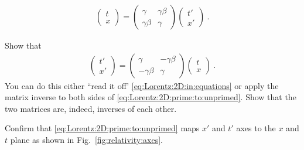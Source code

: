 \documentclass[12pt, oneside]{report}    %
\begin{document}
\begin{align}
    \begin{pmatrix}
        t\\
        x
    \end{pmatrix}
    =
    \begin{pmatrix}
        \gamma & \gamma \beta \\
        \gamma \beta & \gamma
    \end{pmatrix}
    \begin{pmatrix}
        t'\\
        x'
    \end{pmatrix} \ .
    \label{eq:Lorentz:2D:prime:to:unprimed}
\end{align}
\begin{exercise}
Show that 
\begin{align}
    \begin{pmatrix}
        t'\\
        x'
    \end{pmatrix}
    =
    \begin{pmatrix}
        \gamma & -\gamma \beta \\
        -\gamma \beta & \gamma
    \end{pmatrix}
    \begin{pmatrix}
        t\\
        x
    \end{pmatrix} \ .
\end{align}
You can do this either ``read it off' \eqref{eq:Lorentz:2D:in:equations} or apply the matrix inverse to both sides of \eqref{eq:Lorentz:2D:prime:to:unprimed}. Show that the two matrices are, indeed, inverses of each other.
\end{exercise}
\begin{exercise}
Confirm that \eqref{eq:Lorentz:2D:prime:to:unprimed} maps $x'$ and $t'$ axes to the $x$ and $t$ plane as shown in Fig.~\ref{fig:relativity:axes}.
\end{exercise}

\end{document}
